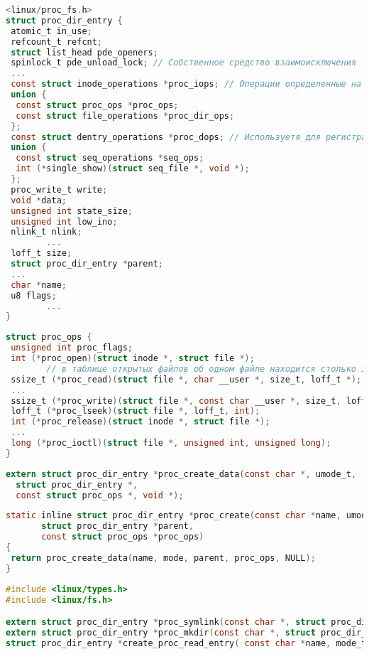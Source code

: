 \begin{lstlisting}[language=C, label=lst:1, caption= Структура proc\_dir\_entry]
<linux/proc_fs.h>
struct proc_dir_entry {
 atomic_t in_use;
 refcount_t refcnt;
 struct list_head pde_openers; 
 spinlock_t pde_unload_lock; // Собственное средство взаимоисключения
 ...
 const struct inode_operations *proc_iops; // Операции определенные на inode фс proc
 union {
  const struct proc_ops *proc_ops;
  const struct file_operations *proc_dir_ops;
 };
 const struct dentry_operations *proc_dops; // Используетя для регистрации своих операций над файлом в proc
 union {
  const struct seq_operations *seq_ops;
  int (*single_show)(struct seq_file *, void *);
 };
 proc_write_t write;
 void *data;
 unsigned int state_size;
 unsigned int low_ino;
 nlink_t nlink;
        ...
 loff_t size;
 struct proc_dir_entry *parent;
 ...
 char *name;
 u8 flags;
        ...
} 
\end{lstlisting}

\begin{lstlisting}[language=C, label=lst:1, caption= Структура proc\_ops]
struct proc_ops {
 unsigned int proc_flags;
 int (*proc_open)(struct inode *, struct file *);
        // в таблице открытых файлов об одном файле находится столько записей, сколько раз он был открыт
 ssize_t (*proc_read)(struct file *, char __user *, size_t, loff_t *);
 ...
 ssize_t (*proc_write)(struct file *, const char __user *, size_t, loff_t *);
 loff_t (*proc_lseek)(struct file *, loff_t, int);
 int (*proc_release)(struct inode *, struct file *);
 ...
 long (*proc_ioctl)(struct file *, unsigned int, unsigned long);
}
\end{lstlisting}

\begin{lstlisting}[language=C, label=lst:1, caption= Функция proc\_create\_data]
extern struct proc_dir_entry *proc_create_data(const char *, umode_t,
  struct proc_dir_entry *,
  const struct proc_ops *, void *);
\end{lstlisting}

\begin{lstlisting}[language=C, label=lst:1, caption= Функция proc\_create]
static inline struct proc_dir_entry *proc_create(const char *name, umode_t mode,
       struct proc_dir_entry *parent,
       const struct proc_ops *proc_ops)
{
 return proc_create_data(name, mode, parent, proc_ops, NULL);
}
\end{lstlisting}

\begin{lstlisting}[language=C, label=lst:1, caption= Хз чо это]
#include <linux/types.h>
#include <linux/fs.h>

extern struct proc_dir_entry *proc_symlink(const char *, struct proc_dir_entry *, const char *);
extern struct proc_dir_entry *proc_mkdir(const char *, struct proc_dir_entry *);
struct proc_dir_entry *create_proc_read_entry( const char *name, mode_t mode, struct proc_dir_entry *base, read_proc_t *read_proc, void *data );
\end{lstlisting}

